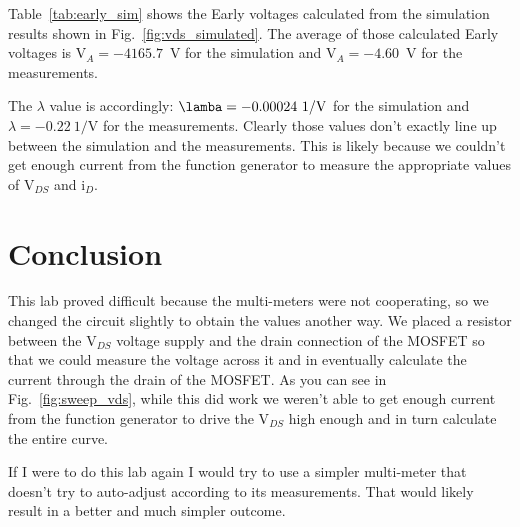 \documentclass{../../ece-report}
\begin{document}
Table~\ref{tab:early_sim} shows the Early voltages calculated
from the simulation results shown in Fig.~\ref{fig:vds_simulated}.
The average of those calculated Early voltages is V$_{A}
= -4165.7$~V for the simulation and V$_{A} = -4.60$~V for the measurements.

The $\lambda$ value is accordingly: $\lamba=-0.00024~1/\si{\V}$
for the simulation and $\lambda=-0.22~1/\si{\V}$ for
the measurements. Clearly those values don't exactly
line up between the simulation and the measurements.
This is likely because we couldn't get enough current
from the function generator to measure the appropriate
values of V$_{DS}$ and i$_D$.




\section{Conclusion}

This lab proved difficult because the multi-meters were
not cooperating, so we changed the circuit slightly
to obtain the values another way. We placed a resistor
between the V$_{DS}$ voltage supply and the drain connection
of the MOSFET so that we could measure the voltage across
it and in eventually calculate the current through the
drain of the MOSFET. As you can see in Fig.~\ref{fig:sweep_vds},
while this did work we weren't able to get enough current
from the function generator to drive the V$_{DS}$ high
enough and in turn calculate the entire curve.

If I were to do this lab again I would try to use a
simpler multi-meter that doesn't try to auto-adjust
according to its measurements. That would likely result
in a better and much simpler outcome.
\end{document}

